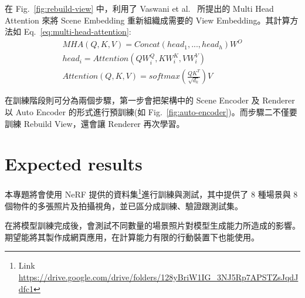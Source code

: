 \documentclass[10pt,twocolumn,letterpaper]{article}
\begin{document}
\begin{CJK}{UTF8}{bkai}
   在 Fig.~\ref{fig:rebuild-view} 中，利用了 Vaswani et al.~\cite{AttentionIsAllYouNeed} 所提出的
   Multi Head Attention 來將 Scene Embedding 重新組織成需要的 View Embedding。其計算方法如 Eq.~\ref{eq:multi-head-attention}:
   \begin{equation}
      \begin{aligned}
         MHA(Q, K, V) = Concat(head_{1},...,head_{h})W^{O}      \\
         head_{i} = Attention(QW^{Q}_{i},KW^{K}_{i},VW^{V}_{i}) \\
         Attention(Q, K, V ) = softmax(\frac{QK^{T}}{\sqrt{d_{k}}})V
      \end{aligned}
      \label{eq:multi-head-attention}
   \end{equation}

   在訓練階段則可分為兩個步驟，第一步會把架構中的 Scene Encoder 及 Renderer 以 Auto Encoder 的形式進行預訓練(如
   Fig.~\ref{fig:auto-encoder})。而步驟二不僅要訓練 Rebuild View，還會讓 Renderer 再次學習。

   \section{Expected results}
   本專題將會使用 NeRF 提供的資料集\footnote{Link \href{https://drive.google.com/drive/folders/128yBriW1IG_3NJ5Rp7APSTZsJqdJdfc1}{https://drive.google.com/drive/folders/128yBriW1IG\_3NJ5Rp7APSTZsJqdJdfc1}}進行訓練與測試，其中提供了
   8 種場景與 8 個物件的多張照片及拍攝視角，並已區分成訓練、驗證跟測試集。

   在將模型訓練完成後，會測試不同數量的場景照片對模型生成能力所造成的影響。期望能將其製作成網頁應用，在計算能力有限的行動裝置下也能使用。

   {\small
   
   
   }
\end{CJK}
\end{document}
